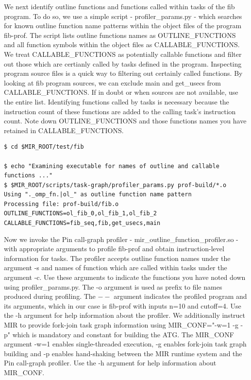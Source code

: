 \documentclass[11pt,a4paper,notitlepage]{article}
\begin{document}
We next identify outline functions and functions called within tasks of the fib program. 
To do so, we use a simple script - profiler\_params.py - which searches for known outline function name patterns within the object files of the program fib-prof. 
The script lists outline functions names as OUTLINE\_FUNCTIONS and all function symbols within the object files as CALLABLE\_FUNCTIONS.
We treat CALLABLE\_FUNCTIONS as potentially callable functions and filter out those which are certianly called by tasks defined in the program. 
Inspecting program source files is a quick way to filtering out certainly called functions. 
By looking at fib program sources, we can exclude main and get\_usecs from CALLABLE\_FUNCTIONS. 
If in doubt or when sources are not available, use the entire list.
Identifying functions called by tasks is necessary because the instruction count of these functions are added to the calling task's instruction count.
Note down OUTLINE\_FUNCTIONS and those functions names you have retained in CALLABLE\_FUNCTIONS.

\begin{lstlisting}[style=BashInputStyle]
$ cd $MIR_ROOT/test/fib

$ echo "Examining executable for names of outline and callable functions ..."
$ $MIR_ROOT/scripts/task-graph/profiler_params.py prof-build/*.o
Using "._omp_fn.|ol_" as outline function name pattern
Processing file: prof-build/fib.o
OUTLINE_FUNCTIONS=ol_fib_0,ol_fib_1,ol_fib_2
CALLABLE_FUNCTIONS=fib_seq,fib,get_usecs,main
\end{lstlisting}

Now we invoke the Pin call-graph profiler - mir\_outline\_function\_profiler.so - with appropriate arguments to profile fib-prof and obtain instruction-level information for tasks.
The profiler accepts outline function names under the argument -s and names of function which are called within tasks under the argument -c. 
Use these arguments to indicate the functions you have noted down using profiler\_params.py.
The -o argument is used as prefix to file names produced during profiling.
The $--$ argument indicates the profiled program and its arguments, which in our case is fib-prof with inputs n=10 and cutoff=4.
Use the -h argument for help information about the profiler.
We additionally instruct MIR to provide fork-join task graph information using MIR\_CONF="-w=1 -g -p" which is mandatory and constant for building the ATG.
The MIR\_CONF argument -w=1 enables single-threaded execution, -g enables fork-join task graph building and -p enables hand-shaking between the MIR runtime system and the Pin call-graph profiler.
Use the -h argument for help information about MIR\_CONF.
\end{document}
